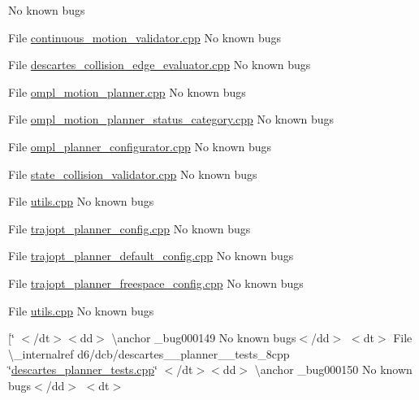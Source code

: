 \begin{DoxyRefList}
%
No known bugs 
\item[File \mbox{\hyperlink{continuous__motion__validator_8cpp}{continuous\+\_\+motion\+\_\+validator.cpp}} ]\label{bug__bug000138}%
%
No known bugs 
\item[File \mbox{\hyperlink{descartes__collision__edge__evaluator_8cpp}{descartes\+\_\+collision\+\_\+edge\+\_\+evaluator.cpp}} ]\label{bug__bug000126}%
%
No known bugs 
\item[File \mbox{\hyperlink{ompl__motion__planner_8cpp}{ompl\+\_\+motion\+\_\+planner.cpp}} ]\label{bug__bug000140}%
%
No known bugs 
\item[File \mbox{\hyperlink{ompl__motion__planner__status__category_8cpp}{ompl\+\_\+motion\+\_\+planner\+\_\+status\+\_\+category.cpp}} ]\label{bug__bug000141}%
%
No known bugs 
\item[File \mbox{\hyperlink{ompl__planner__configurator_8cpp}{ompl\+\_\+planner\+\_\+configurator.cpp}} ]\label{bug__bug000142}%
%
No known bugs 
\item[File \mbox{\hyperlink{state__collision__validator_8cpp}{state\+\_\+collision\+\_\+validator.cpp}} ]\label{bug__bug000143}%
%
No known bugs 
\item[File \mbox{\hyperlink{ompl_2utils_8cpp}{utils.cpp}} ]\label{bug__bug000144}%
%
No known bugs 
\item[File \mbox{\hyperlink{trajopt__planner__config_8cpp}{trajopt\+\_\+planner\+\_\+config.cpp}} ]\label{bug__bug000145}%
%
No known bugs 
\item[File \mbox{\hyperlink{trajopt__planner__default__config_8cpp}{trajopt\+\_\+planner\+\_\+default\+\_\+config.cpp}} ]\label{bug__bug000146}%
%
No known bugs 
\item[File \mbox{\hyperlink{trajopt__planner__freespace__config_8cpp}{trajopt\+\_\+planner\+\_\+freespace\+\_\+config.cpp}} ]\label{bug__bug000147}%
%
No known bugs 
\item[File \mbox{\hyperlink{trajopt_2config_2utils_8cpp}{utils.cpp}} ]\label{bug__bug000148}%
%
No known bugs 
\item[\char`\"{} $<$/dt$>$$<$dd$>$ \textbackslash{}anchor \+\_\+bug000149 No known bugs$<$/dd$>$ $<$dt$>$
\+File \textbackslash{}\+\_\+internalref d6/dcb/descartes\+\_\+\+\_\+planner\+\_\+\+\_\+tests\+\_\+8cpp \char`\"{}\mbox{\hyperlink{descartes__planner__tests_8cpp}{descartes\+\_\+planner\+\_\+tests.\+cpp}}\char`\"{} $<$/dt$>$$<$dd$>$ \textbackslash{}anchor \+\_\+bug000150 No known bugs$<$/dd$>$ $<$dt$>$

\end{DoxyRefList}
